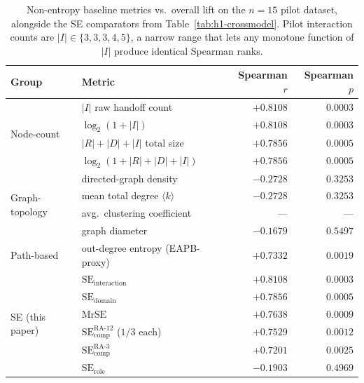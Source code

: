 \documentclass[11pt,a4paper]{article}
\newcommand{\se}{\mathrm{SE}}
\newcommand{\serole}{\se_{\text{role}}}
\newcommand{\sedom}{\se_{\text{domain}}}
\newcommand{\seint}{\se_{\text{interaction}}}
\newcommand{\secomp}{\se_{\text{comp}}}
\newcommand{\mrse}{\mathrm{MrSE}}
\begin{document}
\begin{table}[t]
\centering
\caption{Non-entropy baseline metrics vs.\ overall lift on the
$n=15$ pilot dataset, alongside the SE comparators from
Table~\ref{tab:h1-crossmodel}. Pilot interaction counts are
$|I| \in \{3,3,3,4,5\}$, a narrow range that lets any monotone
function of $|I|$ produce identical Spearman ranks.}
\label{tab:baseline-comparison}
\small
\begin{tabular}{@{}llrr@{}}
\toprule
\textbf{Group} & \textbf{Metric} & \textbf{Spearman $r$} & \textbf{Spearman $p$} \\
\midrule
\multirow{4}{*}{Node-count} & $|I|$ raw handoff count                       & $\mathbf{+0.8108}$ & $\mathbf{0.0003}$ \\
                            & $\log_2(1+|I|)$                               & $\mathbf{+0.8108}$ & $\mathbf{0.0003}$ \\
                            & $|R|+|D|+|I|$ total size                      & $\mathbf{+0.7856}$ & $\mathbf{0.0005}$ \\
                            & $\log_2(1+|R|+|D|+|I|)$                       & $\mathbf{+0.7856}$ & $\mathbf{0.0005}$ \\
\midrule
\multirow{4}{*}{Graph-topology} & directed-graph density                    & $-0.2728$ & $0.3253$ \\
                                & mean total degree $\langle k \rangle$     & $-0.2728$ & $0.3253$ \\
                                & avg.\ clustering coefficient              & --- & --- \\
                                & graph diameter                            & $-0.1679$ & $0.5497$ \\
\midrule
Path-based & out-degree entropy (EAPB-proxy)                                & $+0.7332$ & $0.0019$ \\
\midrule
\multirow{6}{*}{SE (this paper)} & $\seint$                                & $\mathbf{+0.8108}$ & $\mathbf{0.0003}$ \\
                                 & $\sedom$                                & $\mathbf{+0.7856}$ & $\mathbf{0.0005}$ \\
                                 & $\mrse$                                 & $+0.7638$ & $0.0009$ \\
                                 & $\secomp^{\text{RA-12}}$ ($1/3$ each)   & $+0.7529$ & $0.0012$ \\
                                 & $\secomp^{\text{RA-3}}$                 & $+0.7201$ & $0.0025$ \\
                                 & $\serole$                               & $-0.1903$ & $0.4969$ \\
\bottomrule
\end{tabular}
\end{table}
\end{document}
